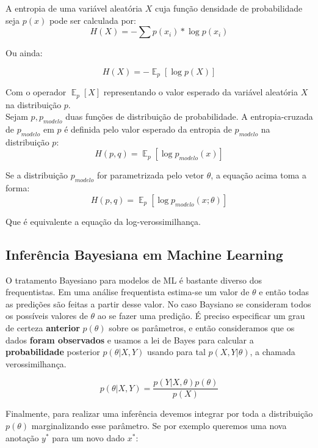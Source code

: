 A entropia de uma variável aleatória $X$ cuja função densidade
de probabilidade seja $p(x)$ pode ser calculada por: \\

\[ H(X)  = - \sum p(x_i)*\log p(x_i) \]

Ou ainda:

\[H(X) = - \mathop{\mathbb{E}}_p[\log p(X)] \]

Com o operador $\mathop{\mathbb{E}}_p[X]$ representando o valor esperado da
variável aleatória $X$ na distribuição $p$. \\

Sejam $p,p_{modelo}$ duas funções de distribuição de probabilidade. A entropia-cruzada de $p_{modelo}$ em $p$ é definida pelo valor
esperado da entropia de $p_{modelo}$ na distribuição $p$: \\

\[H(p,q) =  \mathop{\mathbb{E}}_p[\log p_{modelo}(x)] \]

Se a distribuição $p_{modelo}$ for parametrizada pelo vetor $\theta$, a equação
acima toma a forma: \\


\[H(p,q) =  \mathop{\mathbb{E}}_p[\log p_{modelo}(x ; \theta)] \]

Que é equivalente a equação da log-verossimilhança.  


\subsection{Inferência Bayesiana em Machine Learning}

O tratamento Bayesiano para modelos de ML é bastante diverso dos frequentistas. Em uma análise frequentista estima-se um valor de $\theta$ e então todas as predições são feitas a partir desse valor. No caso Baysiano se consideram todos os possíveis valores de $\theta$ ao se fazer uma predição. É preciso especificar um grau de certeza \textbf{anterior} $p(\theta)$ sobre os parâmetros, e então consideramos que os dados \textbf{foram observados} e usamos a lei de Bayes para calcular a \textbf{probabilidade} posterior $p(\theta | X,Y)$ usando para tal $p(X,Y | \theta)$, a chamada verossimilhança. 

\[    p(\theta | X,Y) = \frac{p(Y| X,\theta) p(\theta)}{p(X)}   \]

Finalmente, para realizar uma inferência devemos integrar por toda a distribuição $p(\theta)$ marginalizando esse parâmetro. Se por exemplo queremos uma nova anotação $y^*$ para um novo dado $x^*$:

